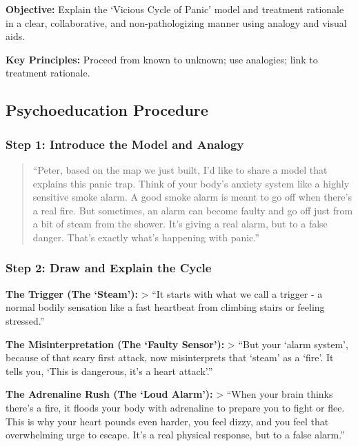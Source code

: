 \documentclass[
  american,
  11pt,
  11pt,
  letterpaper,
  onecolumn]{article}
\begin{document}
\textbf{Objective:} Explain the `Vicious Cycle of Panic' model and
treatment rationale in a clear, collaborative, and non-pathologizing
manner using analogy and visual aids.

\textbf{Key Principles:} Proceed from known to unknown; use analogies;
link to treatment rationale.

\subsection{Psychoeducation Procedure}\label{psychoeducation-procedure}

\subsubsection{Step 1: Introduce the Model and
Analogy}\label{step-1-introduce-the-model-and-analogy}

\begin{quote}
``Peter, based on the map we just built, I'd like to share a model that
explains this panic trap. Think of your body's anxiety system like a
highly sensitive smoke alarm. A good smoke alarm is meant to go off when
there's a real fire. But sometimes, an alarm can become faulty and go
off just from a bit of steam from the shower. It's giving a real alarm,
but to a false danger. That's exactly what's happening with panic.''
\end{quote}

\subsubsection{Step 2: Draw and Explain the
Cycle}\label{step-2-draw-and-explain-the-cycle}

\textbf{The Trigger (The `Steam'):} \textgreater{} ``It starts with what
we call a trigger - a normal bodily sensation like a fast heartbeat from
climbing stairs or feeling stressed.''

\textbf{The Misinterpretation (The `Faulty Sensor'):} \textgreater{}
``But your `alarm system', because of that scary first attack, now
misinterprets that `steam' as a `fire'. It tells you, `This is
dangerous, it's a heart attack'.''

\textbf{The Adrenaline Rush (The `Loud Alarm'):} \textgreater{} ``When
your brain thinks there's a fire, it floods your body with adrenaline to
prepare you to fight or flee. This is why your heart pounds even harder,
you feel dizzy, and you feel that overwhelming urge to escape. It's a
real physical response, but to a false alarm.''
\end{document}
